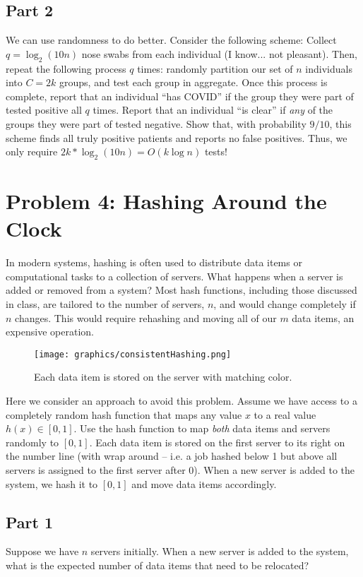 \documentclass{article}
\begin{document}
\subsection*{Part 2}
We can use randomness to do better. Consider the following scheme: Collect $q = \log_2 (10n)$ nose swabs from each individual (I know... not pleasant). Then, repeat the following process $q$ times: randomly partition our set of $n$ individuals into $C=2k$ groups, and test each group in aggregate. Once this process is complete, report that an individual ``has COVID'' if the group they were part of tested positive all $q$ times. Report that an individual ``is clear'' if \emph{any} of the groups they were part of tested negative. Show that, with probability $9/10$, this scheme finds all truly positive patients and reports no false positives. Thus, we only require $2k * \log_2(10n) = O(k\log n)$ tests!

%

\newpage \section*{Problem 4: Hashing Around the Clock}

In modern systems, hashing is often used to distribute data items or computational tasks to a collection of servers. What happens when a server is added or removed from a system? Most hash functions, including those discussed in class, are tailored to the number of servers, $n$, and would change completely if $n$ changes. This would require rehashing and moving all of our $m$ data items, an expensive operation.

\begin{figure}[h]
	\centering
	\texttt{[image: graphics/consistentHashing.png]}
	\caption{Each data item is stored on the server with matching color.}
\end{figure}

Here we consider an approach to avoid this problem. Assume we have access to a completely random hash function that maps any value $x$ to a real value $h(x) \in [0,1]$. Use the hash function to map \emph{both} data items and servers randomly to $[0,1]$. Each data item is stored on the first server to its right on the number line (with wrap around -- i.e. a job hashed below 1 but above all servers is assigned to the first server after 0). When a new server is added to the system, we hash it to $[0,1]$ and move data items accordingly.

\subsection*{Part 1}
Suppose we have $n$ servers initially. When a new server is added to the system, what is the expected number of data items that need to be relocated? 
	
\end{document}

